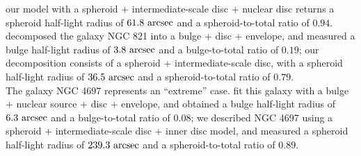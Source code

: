 \documentclass[useAMS,usenatbib,article]{mn2e}
\begin{document}
our model with a spheroid + intermediate-scale disc + nuclear disc 
returns a spheroid half-light radius of $61.8~\rm arcsec$ and a spheroid-to-total ratio of $0.94$. \\
\cite{lasker2014data} decomposed the galaxy NGC 821 into a bulge + disc + envelope, 
and measured a bulge half-light radius of $3.8~\rm arcsec$ and a bulge-to-total ratio of $0.19$; 
our decomposition consists of a spheroid + intermediate-scale disc, 
with a spheroid half-light radius of $36.5~\rm arcsec$ and a spheroid-to-total ratio of $0.79$. \\
The galaxy NGC 4697 represents an ``extreme'' case. 
\cite{lasker2014data} fit this galaxy with a bulge + nuclear source + disc + envelope, 
and obtained a bulge half-light radius of $6.3~\rm arcsec$ and a bulge-to-total ratio of $0.08$; 
we described NGC 4697 using a spheroid + intermediate-scale disc + inner disc model, 
and measured a spheroid half-light radius of $239.3~\rm arcsec$ and a spheroid-to-total ratio of $0.89$.
\end{document}
